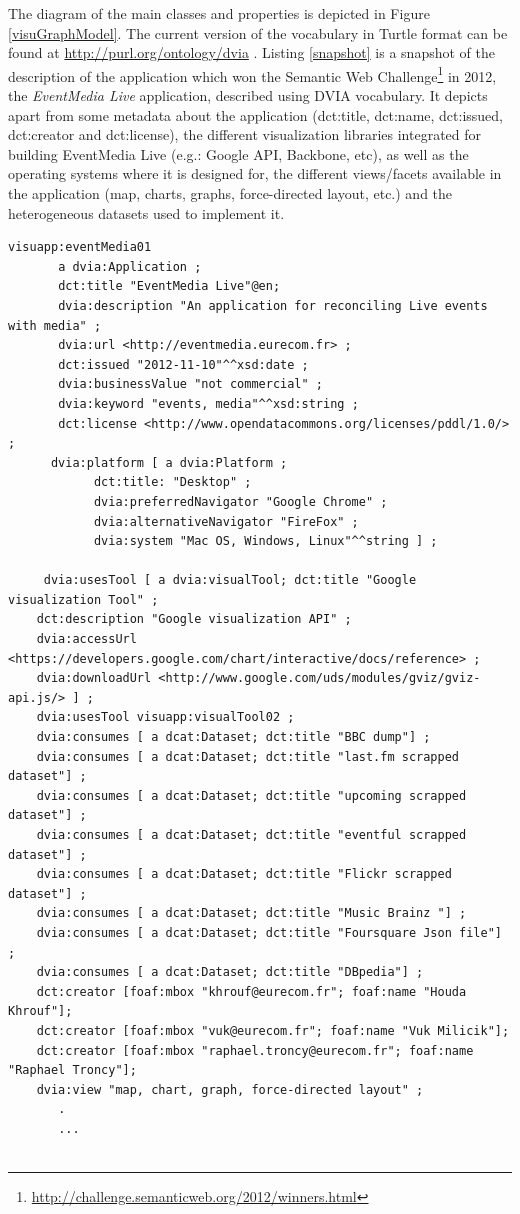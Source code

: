 The diagram of the main classes and properties is depicted in Figure \ref{visuGraphModel}. The current version of the vocabulary in Turtle format can be found at \url{http://purl.org/ontology/dvia} .  Listing \ref{snapshot} is a snapshot of the description of the application which won the Semantic Web Challenge\footnote{\url{http://challenge.semanticweb.org/2012/winners.html}} in 2012, the \textit{EventMedia Live} application, described using DVIA vocabulary. It depicts apart from some metadata about the application (dct:title, dct:name, dct:issued, dct:creator and dct:license), the different visualization libraries integrated for building EventMedia Live (e.g.: Google API, Backbone, etc), as well as the operating systems where it is designed for, the different views/facets available in the application (map, charts, graphs, force-directed layout, etc.) and the heterogeneous datasets used to implement it. 

\begin{lstlisting}
visuapp:eventMedia01
       a dvia:Application ; 
       dct:title "EventMedia Live"@en;   
       dvia:description "An application for reconciling Live events with media" ; 
       dvia:url <http://eventmedia.eurecom.fr> ; 
       dct:issued "2012-11-10"^^xsd:date ; 
       dvia:businessValue "not commercial" ;   
       dvia:keyword "events, media"^^xsd:string ; 
       dct:license <http://www.opendatacommons.org/licenses/pddl/1.0/> ; 
      dvia:platform [ a dvia:Platform ; 
			dct:title: "Desktop" ;
			dvia:preferredNavigator "Google Chrome" ; 
			dvia:alternativeNavigator "FireFox" ;
			dvia:system "Mac OS, Windows, Linux"^^string ] ; 
		
     dvia:usesTool [ a dvia:visualTool; dct:title "Google visualization Tool" ; 
	dct:description "Google visualization API" ; 
	dvia:accessUrl <https://developers.google.com/chart/interactive/docs/reference> ; 
	dvia:downloadUrl <http://www.google.com/uds/modules/gviz/gviz-api.js/> ] ;
    dvia:usesTool visuapp:visualTool02 ;
    dvia:consumes [ a dcat:Dataset; dct:title "BBC dump"] ; 
    dvia:consumes [ a dcat:Dataset; dct:title "last.fm scrapped dataset"] ;
    dvia:consumes [ a dcat:Dataset; dct:title "upcoming scrapped dataset"] ;
    dvia:consumes [ a dcat:Dataset; dct:title "eventful scrapped dataset"] ;
    dvia:consumes [ a dcat:Dataset; dct:title "Flickr scrapped dataset"] ;
    dvia:consumes [ a dcat:Dataset; dct:title "Music Brainz "] ;
    dvia:consumes [ a dcat:Dataset; dct:title "Foursquare Json file"] ;
    dvia:consumes [ a dcat:Dataset; dct:title "DBpedia"] ;
    dct:creator [foaf:mbox "khrouf@eurecom.fr"; foaf:name "Houda Khrouf"];
    dct:creator [foaf:mbox "vuk@eurecom.fr"; foaf:name "Vuk Milicik"];
    dct:creator [foaf:mbox "raphael.troncy@eurecom.fr"; foaf:name "Raphael Troncy"];
    dvia:view "map, chart, graph, force-directed layout" ; 
       .
	   ...
	
\end{lstlisting}

